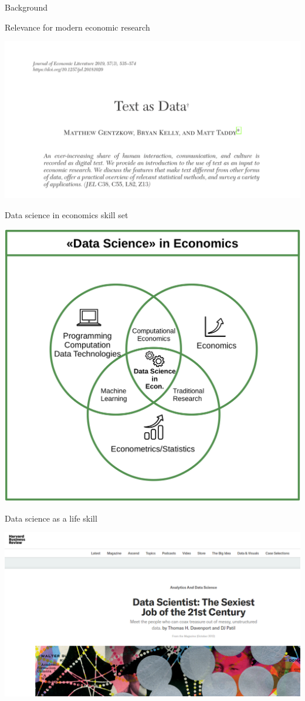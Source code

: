 \documentclass[
  ignorenonframetext,
]{beamer}
\begin{document}
\begin{frame}{Background}
\begin{block}{Relevance for modern economic research}
\protect\hypertarget{relevance-for-modern-economic-research-3}{}
\begin{center}\includegraphics[width=0.9\linewidth]{../../img/text} \end{center}
\end{block}

\begin{block}{Data science in economics skill set}
\protect\hypertarget{data-science-in-economics-skill-set}{}
\begin{center}\includegraphics[width=0.6\linewidth]{../../img/venn_diagramm} \end{center}
\end{block}

\begin{block}{Data science as a life skill}
\protect\hypertarget{data-science-as-a-life-skill}{}
\begin{center}\includegraphics[width=0.8\linewidth]{../../img/datascientistsexy} \end{center}
\end{block}


\end{frame}
\end{document}
